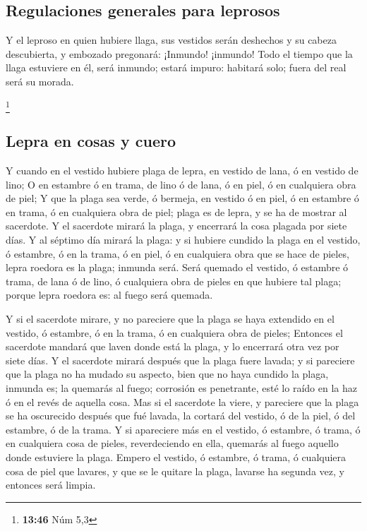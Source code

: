 \hypertarget{regulaciones-generales-para-leprosos}{%
\subsection{Regulaciones generales para
leprosos}\label{regulaciones-generales-para-leprosos}}

 Y el leproso en quien hubiere llaga, sus vestidos serán
deshechos y su cabeza descubierta, y embozado pregonará: ¡Inmundo!
¡inmundo!  Todo el tiempo que la llaga estuviere en él,
será inmundo; estará impuro: habitará solo; fuera del real será su
morada.

\footnote{\textbf{13:46} Núm 5,3}

\hypertarget{lepra-en-cosas-y-cuero}{%
\subsection{Lepra en cosas y cuero}\label{lepra-en-cosas-y-cuero}}

 Y cuando en el vestido hubiere plaga de lepra, en vestido
de lana, ó en vestido de lino;  O en estambre ó en trama,
de lino ó de lana, ó en piel, ó en cualquiera obra de piel;
 Y que la plaga sea verde, ó bermeja, en vestido ó en piel,
ó en estambre ó en trama, ó en cualquiera obra de piel; plaga es de
lepra, y se ha de mostrar al sacerdote.  Y el sacerdote
mirará la plaga, y encerrará la cosa plagada por siete días.
 Y al séptimo día mirará la plaga: y si hubiere cundido la
plaga en el vestido, ó estambre, ó en la trama, ó en piel, ó en
cualquiera obra que se hace de pieles, lepra roedora es la plaga;
inmunda será.  Será quemado el vestido, ó estambre ó trama,
de lana ó de lino, ó cualquiera obra de pieles en que hubiere tal plaga;
porque lepra roedora es: al fuego será quemada.

 Y si el sacerdote mirare, y no pareciere que la plaga se
haya extendido en el vestido, ó estambre, ó en la trama, ó en cualquiera
obra de pieles;  Entonces el sacerdote mandará que laven
donde está la plaga, y lo encerrará otra vez por siete días.
 Y el sacerdote mirará después que la plaga fuere lavada; y
si pareciere que la plaga no ha mudado su aspecto, bien que no haya
cundido la plaga, inmunda es; la quemarás al fuego; corrosión es
penetrante, esté lo raído en la haz ó en el revés de aquella cosa.
 Mas si el sacerdote la viere, y pareciere que la plaga se
ha oscurecido después que fué lavada, la cortará del vestido, ó de la
piel, ó del estambre, ó de la trama.  Y si apareciere más
en el vestido, ó estambre, ó trama, ó en cualquiera cosa de pieles,
reverdeciendo en ella, quemarás al fuego aquello donde estuviere la
plaga.  Empero el vestido, ó estambre, ó trama, ó
cualquiera cosa de piel que lavares, y que se le quitare la plaga,
lavarse ha segunda vez, y entonces será limpia.

